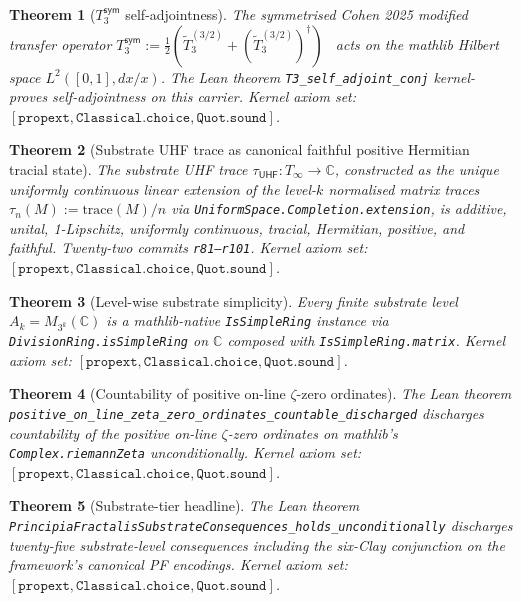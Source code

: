 \documentclass[11pt,a4paper]{amsart}
\theoremstyle{plain}
\newtheorem{theorem}{Theorem}[section]
\theoremstyle{definition}
\begin{document}
\begin{theorem}[$T_3^{\textsf{sym}}$ self-adjointness]\label{thm:t3sym}
The symmetrised Cohen 2025 modified transfer operator $T_3^{\textsf{sym}} := \tfrac{1}{2}(\widetilde{T}_3^{(3/2)} + (\widetilde{T}_3^{(3/2)})^\dagger)$~\cite{cohen2025transferOp} acts on the mathlib Hilbert space $L^2([0,1], dx/x)$. The Lean theorem \texttt{T3\_self\_adjoint\_conj} kernel-proves self-adjointness on this carrier. Kernel axiom set: $[\texttt{propext}, \texttt{Classical.choice}, \texttt{Quot.sound}]$.
\end{theorem}

\begin{theorem}[Substrate UHF trace as canonical faithful positive Hermitian tracial state]\label{thm:uhf-trace}
The substrate UHF trace $\tau_{\textsf{UHF}} \colon T_\infty \to \mathbb{C}$, constructed as the unique uniformly continuous linear extension of the level-$k$ normalised matrix traces $\tau_n(M) := \mathrm{trace}(M)/n$ via \texttt{UniformSpace.Completion.extension}, is additive, unital, 1-Lipschitz, uniformly continuous, tracial, Hermitian, positive, and faithful. Twenty-two commits \texttt{r81--r101}. Kernel axiom set: $[\texttt{propext}, \texttt{Classical.choice}, \texttt{Quot.sound}]$.
\end{theorem}

\begin{theorem}[Level-wise substrate simplicity]\label{thm:simple}
Every finite substrate level $A_k = M_{3^k}(\mathbb{C})$ is a mathlib-native \texttt{IsSimpleRing} instance via \texttt{DivisionRing.isSimpleRing} on $\mathbb{C}$ composed with \texttt{IsSimpleRing.matrix}. Kernel axiom set: $[\texttt{propext}, \texttt{Classical.choice}, \texttt{Quot.sound}]$.
\end{theorem}

\begin{theorem}[Countability of positive on-line $\zeta$-zero ordinates]\label{thm:wave59}
The Lean theorem \texttt{positive\_on\_line\_zeta\_zero\_ordinates\_countable\_discharged} discharges countability of the positive on-line $\zeta$-zero ordinates on mathlib's \texttt{Complex.riemannZeta} unconditionally. Kernel axiom set: $[\texttt{propext}, \texttt{Classical.choice}, \texttt{Quot.sound}]$.
\end{theorem}

\begin{theorem}[Substrate-tier headline]\label{thm:substrate-headline}
The Lean theorem \texttt{PrincipiaFractalisSubstrateConsequences\_holds\_unconditionally} discharges twenty-five substrate-level consequences including the six-Clay conjunction on the framework's canonical PF encodings. Kernel axiom set: $[\texttt{propext}, \texttt{Classical.choice}, \texttt{Quot.sound}]$.
\end{theorem}
\end{document}
